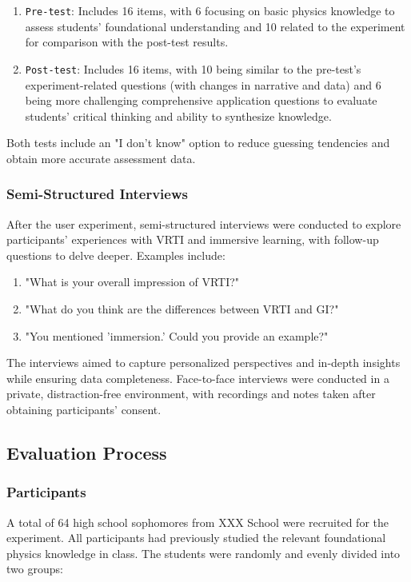 \documentclass[runningheads]{llncs}
\begin{document}
\begin{enumerate}
  \item {\texttt{Pre-test}}: Includes 16 items, with 6 focusing on basic physics knowledge to assess students' foundational understanding and 10 related to the experiment for comparison with the post-test results.

  \item {\texttt{Post-test}}: Includes 16 items, with 10 being similar to the pre-test's experiment-related questions (with changes in narrative and data) and 6 being more challenging comprehensive application questions to evaluate students' critical thinking and ability to synthesize knowledge.
\end{enumerate}

Both tests include an "I don't know" option to reduce guessing tendencies and obtain more accurate assessment data.

\subsubsection{Semi-Structured Interviews}
After the user experiment, semi-structured interviews were conducted to explore participants' experiences with VRTI and immersive learning, with follow-up questions to delve deeper. Examples include:

\begin{enumerate}
  \item "What is your overall impression of VRTI?"
  
  \item "What do you think are the differences between VRTI and GI?"
  
  \item "You mentioned 'immersion.' Could you provide an example?"
\end{enumerate}

The interviews aimed to capture personalized perspectives and in-depth insights while ensuring data completeness. Face-to-face interviews were conducted in a private, distraction-free environment, with recordings and notes taken after obtaining participants' consent.

\subsection{Evaluation Process}
\subsubsection{Participants}
A total of 64 high school sophomores from XXX
School were recruited for the experiment. All participants had previously studied the relevant foundational physics knowledge in class. The students were randomly and evenly divided into two groups:
\end{document}
